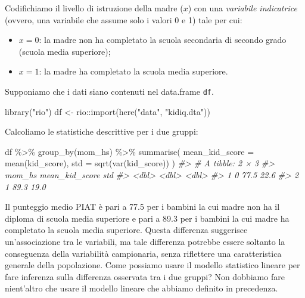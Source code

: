 \documentclass[
  10pt,
  italian,
  a4paper,
  extrafontsizes,onecolumn,openright
  ]{memoir}
\newenvironment{Shaded}{\begin{snugshade}}{\end{snugshade}}
\newcommand{\AttributeTok}[1]{\textcolor[rgb]{0.77,0.63,0.00}{#1}}
\newcommand{\CommentTok}[1]{\textcolor[rgb]{0.56,0.35,0.01}{\textit{#1}}}
\newcommand{\FunctionTok}[1]{\textcolor[rgb]{0.00,0.00,0.00}{#1}}
\newcommand{\NormalTok}[1]{#1}
\newcommand{\OtherTok}[1]{\textcolor[rgb]{0.56,0.35,0.01}{#1}}
\newcommand{\SpecialCharTok}[1]{\textcolor[rgb]{0.00,0.00,0.00}{#1}}
\newcommand{\StringTok}[1]{\textcolor[rgb]{0.31,0.60,0.02}{#1}}
\providecommand{\tightlist}{%
  \setlength{\itemsep}{0pt}\setlength{\parskip}{0pt}}
\begin{document}
Codifichiamo il livello di istruzione della madre (\(x\)) con una \emph{variabile indicatrice} (ovvero, una variabile che assume solo i valori 0 e 1) tale per cui:

\begin{itemize}
\tightlist
\item
  \(x=0\): la madre non ha completato la scuola secondaria di secondo grado (scuola media superiore);
\item
  \(x=1\): la madre ha completato la scuola media superiore.
\end{itemize}

\noindent
Supponiamo che i dati siano contenuti nel data.frame \texttt{df}.

\begin{Shaded}
\begin{Highlighting}[]
\FunctionTok{library}\NormalTok{(}\StringTok{"rio"}\NormalTok{)}
\NormalTok{df }\OtherTok{\textless{}{-}}\NormalTok{ rio}\SpecialCharTok{::}\FunctionTok{import}\NormalTok{(}\FunctionTok{here}\NormalTok{(}\StringTok{"data"}\NormalTok{, }\StringTok{"kidiq.dta"}\NormalTok{))}
\end{Highlighting}
\end{Shaded}

\noindent
Calcoliamo le statistiche descrittive per i due gruppi:

\begin{Shaded}
\begin{Highlighting}[]
\NormalTok{df }\SpecialCharTok{\%\textgreater{}\%} 
  \FunctionTok{group\_by}\NormalTok{(mom\_hs) }\SpecialCharTok{\%\textgreater{}\%} 
  \FunctionTok{summarise}\NormalTok{(}
    \AttributeTok{mean\_kid\_score =} \FunctionTok{mean}\NormalTok{(kid\_score),}
    \AttributeTok{std =} \FunctionTok{sqrt}\NormalTok{(}\FunctionTok{var}\NormalTok{(kid\_score))}
\NormalTok{  )}
\CommentTok{\#\textgreater{} \# A tibble: 2 × 3}
\CommentTok{\#\textgreater{}   mom\_hs mean\_kid\_score   std}
\CommentTok{\#\textgreater{}    \textless{}dbl\textgreater{}          \textless{}dbl\textgreater{} \textless{}dbl\textgreater{}}
\CommentTok{\#\textgreater{} 1      0           77.5  22.6}
\CommentTok{\#\textgreater{} 2      1           89.3  19.0}
\end{Highlighting}
\end{Shaded}

\noindent
Il punteggio medio PIAT è pari a 77.5 per i bambini la cui madre non ha il diploma di scuola media superiore e pari a 89.3 per i bambini la cui madre ha completato la scuola media superiore. Questa differenza suggerisce un'associazione tra le variabili, ma tale differenza potrebbe essere soltanto la conseguenza della variabilità campionaria, senza riflettere una caratteristica generale della popolazione. Come possiamo usare il modello statistico lineare per fare inferenza sulla differenza osservata tra i due gruppi? Non dobbiamo fare nient'altro che usare il modello lineare che abbiamo definito in precedenza.
\end{document}
